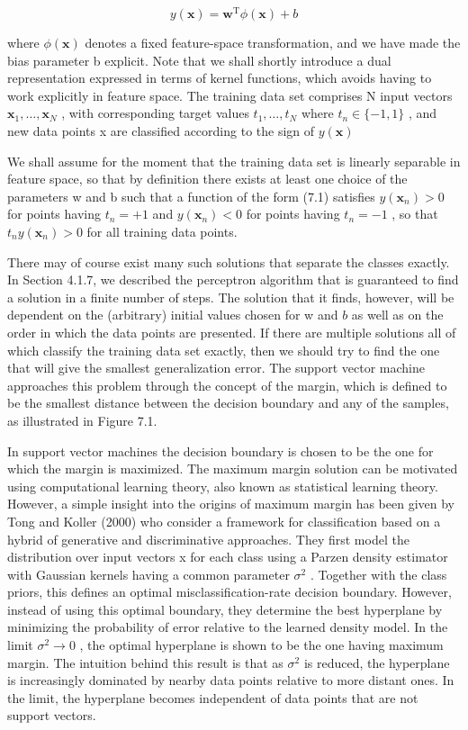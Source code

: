 \documentclass[
  10
]{article}
\begin{document}
\[
y (\mathbf {x}) = \mathbf {w} ^ {\mathrm{T}} \phi (\mathbf {x}) + b\tag{7.1}
\]

where \(\phi ( \mathbf { x } )\) denotes a fixed feature-space
transformation, and we have made the bias parameter b explicit. Note
that we shall shortly introduce a dual representation expressed in terms
of kernel functions, which avoids having to work explicitly in feature
space. The training data set comprises N input vectors
\(\mathbf { x } _ { 1 } , \ldots , \mathbf { x } _ { N }\) , with
corresponding target values \(t _ { 1 } , \ldots , t _ { N }\) where
\(t _ { n } \in \{ - 1 , 1 \}\) , and new data points x are classified
according to the sign of \(y ( \mathbf x )\)

We shall assume for the moment that the training data set is linearly
separable in feature space, so that by definition there exists at least
one choice of the parameters w and b such that a function of the form
(7.1) satisfies \(y ( \mathbf { x } _ { n } ) > 0\) for points having
\(t _ { n } = + 1\) and \(y ( \mathbf { x } _ { n } ) < 0\) for points
having \(t _ { n } = - 1\) , so that
\(t _ { n } y ( \mathbf { x } _ { n } ) > 0\) for all training data
points.

There may of course exist many such solutions that separate the classes
exactly. In Section 4.1.7, we described the perceptron algorithm that is
guaranteed to find a solution in a finite number of steps. The solution
that it finds, however, will be dependent on the (arbitrary) initial
values chosen for w and \(b\) as well as on the order in which the data
points are presented. If there are multiple solutions all of which
classify the training data set exactly, then we should try to find the
one that will give the smallest generalization error. The support vector
machine approaches this problem through the concept of the margin, which
is defined to be the smallest distance between the decision boundary and
any of the samples, as illustrated in Figure 7.1.

In support vector machines the decision boundary is chosen to be the one
for which the margin is maximized. The maximum margin solution can be
motivated using computational learning theory, also known as statistical
learning theory. However, a simple insight into the origins of maximum
margin has been given by Tong and Koller (2000) who consider a framework
for classification based on a hybrid of generative and discriminative
approaches. They first model the distribution over input vectors x for
each class using a Parzen density estimator with Gaussian kernels having
a common parameter \(\sigma ^ { 2 }\) . Together with the class priors,
this defines an optimal misclassification-rate decision boundary.
However, instead of using this optimal boundary, they determine the best
hyperplane by minimizing the probability of error relative to the
learned density model. In the limit \(\sigma ^ { 2 } \to 0\) , the
optimal hyperplane is shown to be the one having maximum margin. The
intuition behind this result is that as \(\sigma ^ { 2 }\) is reduced,
the hyperplane is increasingly dominated by nearby data points relative
to more distant ones. In the limit, the hyperplane becomes independent
of data points that are not support vectors.
\end{document}
